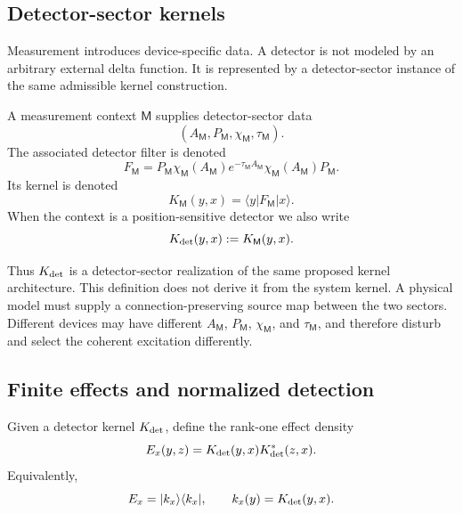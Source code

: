 \documentclass[11pt]{article}
\newcommand{\Meas}{\mathsf M}
\begin{document}
\subsection{Detector-sector kernels}
\label{subsec:detector-sector-kernels}

Measurement introduces device-specific data. A detector is not modeled by an arbitrary
external delta function. It is represented by a detector-sector instance of the same admissible
kernel construction.

\begin{definition}
\label{def:detector-sector-kernel}
A measurement context \(\Meas\) supplies detector-sector data
\begin{equation}
  (A_{\Meas},P_{\Meas},\chi_{\Meas},\tau_{\Meas}).
\end{equation}
The associated detector filter is denoted
\begin{equation}
  F_{\Meas}
  =
  P_{\Meas}\chi_{\Meas}(A_{\Meas})
  e^{-\tau_{\Meas}A_{\Meas}}
  \chi_{\Meas}(A_{\Meas})P_{\Meas}.
  \label{eq:detector-filter-F}
\end{equation}
Its kernel is denoted
\begin{equation}
  K_{\Meas}(y,x)
  =
  \langle y|F_{\Meas}|x\rangle.
  \label{eq:detector-kernel-F}
\end{equation}
When the context is a position-sensitive detector we also write
\begin{equation}
  K_{\rm det}(y,x):=K_{\Meas}(y,x).
\end{equation}
\end{definition}

Thus \(K_{\rm det}\) is a detector-sector realization of the same proposed kernel
architecture. This definition does not derive it from the system kernel. A physical model
must supply a connection-preserving source map between the two sectors. Different devices may have
different \(A_{\Meas}\), \(P_{\Meas}\), \(\chi_{\Meas}\), and \(\tau_{\Meas}\), and therefore disturb and
select the coherent excitation differently.

\subsection{Finite effects and normalized detection}
\label{subsec:finite-effects}

Given a detector kernel \(K_{\rm det}\), define the rank-one effect density
\begin{equation}
  E_x(y,z)
  =
  K_{\rm det}(y,x)K_{\rm det}^\ast(z,x).
  \label{eq:finite-effect-kernel}
\end{equation}
Equivalently,
\begin{equation}
  E_x=|k_x\rangle\langle k_x|,
  \qquad
  k_x(y)=K_{\rm det}(y,x).
\end{equation}
\end{document}
